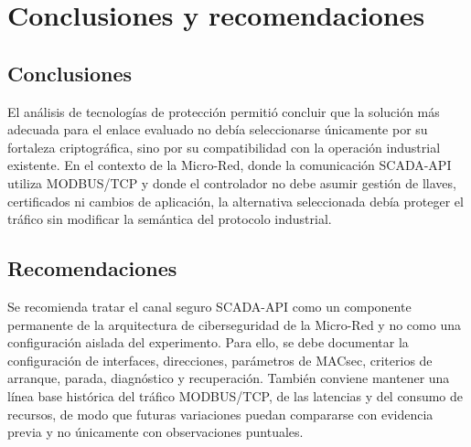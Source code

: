 \chapter{Conclusiones y recomendaciones}
\label{cap:conclusiones}
\glsresetall

\section{Conclusiones}

El análisis de tecnologías de protección permitió concluir que la solución más adecuada para el enlace evaluado no debía seleccionarse únicamente por su fortaleza criptográfica, sino por su compatibilidad con la operación industrial existente. En el contexto de la Micro-Red, donde la comunicación \gls{SCADA}-\gls{API} utiliza \gls{MODBUS}/\gls{TCP} y donde el controlador no debe asumir gestión de llaves, certificados ni cambios de aplicación, la alternativa seleccionada debía proteger el tráfico sin modificar la semántica del protocolo industrial.


\section{Recomendaciones}

Se recomienda tratar el canal seguro \gls{SCADA}-\gls{API} como un componente permanente de la arquitectura de ciberseguridad de la Micro-Red y no como una configuración aislada del experimento. Para ello, se debe documentar la configuración de interfaces, direcciones, parámetros de \gls{MACsec}, criterios de arranque, parada, diagnóstico y recuperación. También conviene mantener una línea base histórica del tráfico \gls{MODBUS}/\gls{TCP}, de las latencias y del consumo de recursos, de modo que futuras variaciones puedan compararse con evidencia previa y no únicamente con observaciones puntuales.
